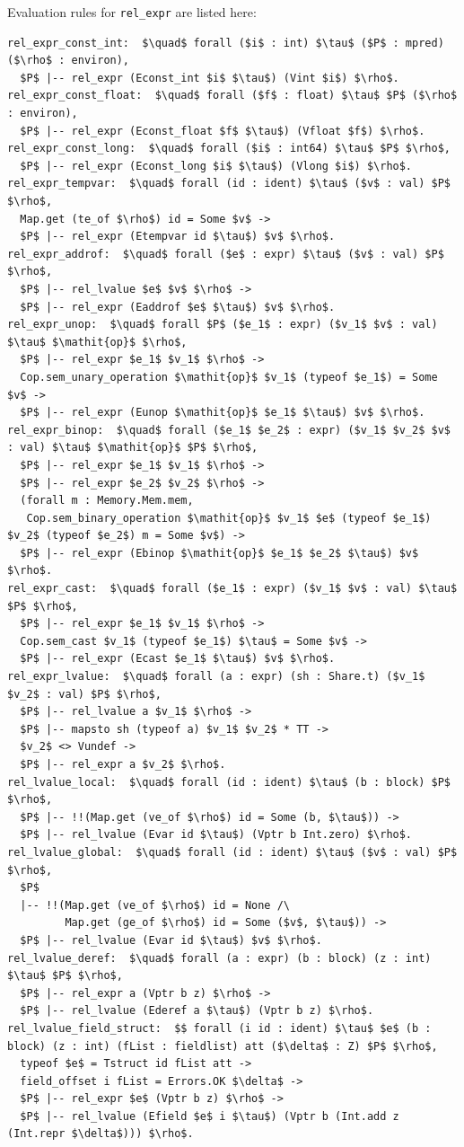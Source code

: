 \documentclass[12pt,fleqn,openany,oneside,showtrims]{memoir}
\begin{document}
Evaluation rules for \lstinline{rel_expr} are listed here:
\begin{lstlisting}
rel_expr_const_int:  $\quad$ forall ($i$ : int) $\tau$ ($P$ : mpred) ($\rho$ : environ),
  $P$ |-- rel_expr (Econst_int $i$ $\tau$) (Vint $i$) $\rho$.
rel_expr_const_float:  $\quad$ forall ($f$ : float) $\tau$ $P$ ($\rho$ : environ),
  $P$ |-- rel_expr (Econst_float $f$ $\tau$) (Vfloat $f$) $\rho$.
rel_expr_const_long:  $\quad$ forall ($i$ : int64) $\tau$ $P$ $\rho$,
  $P$ |-- rel_expr (Econst_long $i$ $\tau$) (Vlong $i$) $\rho$.
rel_expr_tempvar:  $\quad$ forall (id : ident) $\tau$ ($v$ : val) $P$ $\rho$,
  Map.get (te_of $\rho$) id = Some $v$ ->
  $P$ |-- rel_expr (Etempvar id $\tau$) $v$ $\rho$.
rel_expr_addrof:  $\quad$ forall ($e$ : expr) $\tau$ ($v$ : val) $P$ $\rho$,
  $P$ |-- rel_lvalue $e$ $v$ $\rho$ ->
  $P$ |-- rel_expr (Eaddrof $e$ $\tau$) $v$ $\rho$.
rel_expr_unop:  $\quad$ forall $P$ ($e_1$ : expr) ($v_1$ $v$ : val) $\tau$ $\mathit{op}$ $\rho$,
  $P$ |-- rel_expr $e_1$ $v_1$ $\rho$ ->
  Cop.sem_unary_operation $\mathit{op}$ $v_1$ (typeof $e_1$) = Some $v$ ->
  $P$ |-- rel_expr (Eunop $\mathit{op}$ $e_1$ $\tau$) $v$ $\rho$.
rel_expr_binop:  $\quad$ forall ($e_1$ $e_2$ : expr) ($v_1$ $v_2$ $v$ : val) $\tau$ $\mathit{op}$ $P$ $\rho$,
  $P$ |-- rel_expr $e_1$ $v_1$ $\rho$ ->
  $P$ |-- rel_expr $e_2$ $v_2$ $\rho$ ->
  (forall m : Memory.Mem.mem,
   Cop.sem_binary_operation $\mathit{op}$ $v_1$ $e$ (typeof $e_1$) $v_2$ (typeof $e_2$) m = Some $v$) ->
  $P$ |-- rel_expr (Ebinop $\mathit{op}$ $e_1$ $e_2$ $\tau$) $v$ $\rho$.
rel_expr_cast:  $\quad$ forall ($e_1$ : expr) ($v_1$ $v$ : val) $\tau$ $P$ $\rho$,
  $P$ |-- rel_expr $e_1$ $v_1$ $\rho$ ->
  Cop.sem_cast $v_1$ (typeof $e_1$) $\tau$ = Some $v$ ->
  $P$ |-- rel_expr (Ecast $e_1$ $\tau$) $v$ $\rho$.
rel_expr_lvalue:  $\quad$ forall (a : expr) (sh : Share.t) ($v_1$ $v_2$ : val) $P$ $\rho$,
  $P$ |-- rel_lvalue a $v_1$ $\rho$ ->
  $P$ |-- mapsto sh (typeof a) $v_1$ $v_2$ * TT ->
  $v_2$ <> Vundef -> 
  $P$ |-- rel_expr a $v_2$ $\rho$.
rel_lvalue_local:  $\quad$ forall (id : ident) $\tau$ (b : block) $P$ $\rho$,
  $P$ |-- !!(Map.get (ve_of $\rho$) id = Some (b, $\tau$)) ->
  $P$ |-- rel_lvalue (Evar id $\tau$) (Vptr b Int.zero) $\rho$.
rel_lvalue_global:  $\quad$ forall (id : ident) $\tau$ ($v$ : val) $P$ $\rho$,
  $P$
  |-- !!(Map.get (ve_of $\rho$) id = None /\
         Map.get (ge_of $\rho$) id = Some ($v$, $\tau$)) ->
  $P$ |-- rel_lvalue (Evar id $\tau$) $v$ $\rho$.
rel_lvalue_deref:  $\quad$ forall (a : expr) (b : block) (z : int) $\tau$ $P$ $\rho$,
  $P$ |-- rel_expr a (Vptr b z) $\rho$ ->
  $P$ |-- rel_lvalue (Ederef a $\tau$) (Vptr b z) $\rho$.
rel_lvalue_field_struct:  $$ forall (i id : ident) $\tau$ $e$ (b : block) (z : int) (fList : fieldlist) att ($\delta$ : Z) $P$ $\rho$,
  typeof $e$ = Tstruct id fList att ->
  field_offset i fList = Errors.OK $\delta$ ->
  $P$ |-- rel_expr $e$ (Vptr b z) $\rho$ ->
  $P$ |-- rel_lvalue (Efield $e$ i $\tau$) (Vptr b (Int.add z (Int.repr $\delta$))) $\rho$.
\end{lstlisting}
\end{document}

